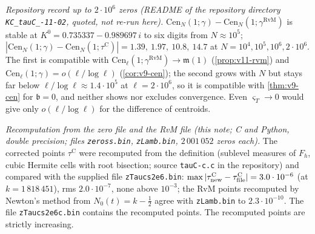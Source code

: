 \documentclass[11pt,a4paper]{article}
\numberwithin{equation}{section}
\theoremstyle{definition}
\theoremstyle{remark}
\begin{document}
\emph{Repository record up to $2\cdot10^6$ zeros (README of the repository directory \texttt{KC\_\allowbreak tauC\_-11-02}, quoted, not re-run here).} $\mathrm{Cen}_N(1;\gamma)-\mathrm{Cen}_N(1;\gamma^{\mathrm{RvM}})$ is stable at $K^0=0.735337-0.989697\,i$ to six digits from $N\approx10^5$; $|\mathrm{Cen}_N(1;\gamma)-\mathrm{Cen}_N(1;\tau^{\mathrm C})|=1.39,\ 1.97,\ 10.8,\ 14.7$ at $N=10^4,10^5,10^6,2\cdot10^6$. The first is compatible with $\mathrm{Cen}_\ell(1;\gamma^{\mathrm{RvM}})\to\mathfrak m(1)$ (\cref{prop:v11-rvm}) and $\mathrm{Cen}_\ell(1;\gamma)=o(\ell/\log\ell)$ (\cref{cor:v9-cen}); the second grows with $N$ but stays far below $\ell/\log\ell\approx1.4\cdot10^5$ at $\ell=2\cdot10^6$, so it is compatible with \cref{thm:v9-cen} for $\mathfrak b=0$, and neither shows nor excludes convergence. Even $\varsigma_T\to0$ would give only $o(\ell/\log\ell)$ for the difference of centroids.

\emph{Recomputation from the zero file and the RvM file (this note; C and Python, double precision; files \texttt{zeross.bin}, \texttt{zLamb.bin}, $2\,001\,052$ zeros each).} The corrected points $\tau^{\mathrm C}$ were recomputed from the definition (sublevel measures of $F_h$, cubic Hermite cells with root bisection; source \texttt{tauC-c.c} in the repository) and compared with the supplied file \texttt{zTaucs2e6.bin}: $\max|\tau^{\mathrm C}_{\rm new}-\tau^{\mathrm C}_{\rm file}|=3.0\cdot10^{-6}$ (at $k=1\,818\,451$), rms $2.0\cdot10^{-7}$, none above $10^{-3}$; the RvM points recomputed by Newton's method from $N_0(t)=k-\frac12$ agree with \texttt{zLamb.bin} to $2.3\cdot10^{-10}$. The file \texttt{zTaucs2e6c.bin} contains the recomputed points. The recomputed points are strictly increasing.
\end{document}

